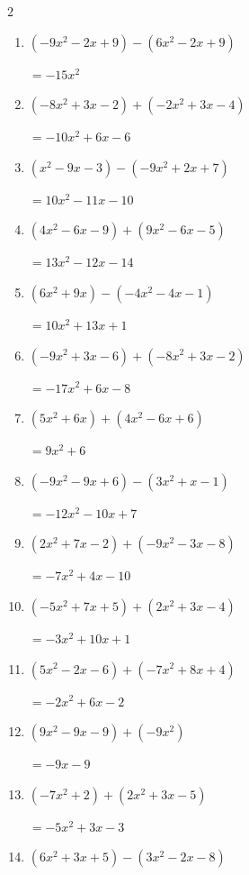 \begin{multicols}{2}
\begin{enumerate}
        $=-2x^{2}+8x+11$

  \item $(-9x^{2}-2x+9)-(6x^{2}-2x+9)$

        $=-15x^{2}$

  \item $(-8x^{2}+3x-2)+(-2x^{2}+3x-4)$

        $=-10x^{2}+6x-6$

  \item $(x^{2}-9x-3)-(-9x^{2}+2x+7)$

        $=10x^{2}-11x-10$

  \item $(4x^{2}-6x-9)+(9x^{2}-6x-5)$

        $=13x^{2}-12x-14$

  \item $(6x^{2}+9x)-(-4x^{2}-4x-1)$

        $=10x^{2}+13x+1$

\columnbreak %

  \item $(-9x^{2}+3x-6)+(-8x^{2}+3x-2)$

        $=-17x^{2}+6x-8$

  \item $(5x^{2}+6x)+(4x^{2}-6x+6)$

        $=9x^{2}+6$

  \item $(-9x^{2}-9x+6)-(3x^{2}+x-1)$

        $=-12x^{2}-10x+7$

  \item $(2x^{2}+7x-2)+(-9x^{2}-3x-8)$

        $=-7x^{2}+4x-10$

  \item $(-5x^{2}+7x+5)+(2x^{2}+3x-4)$

        $=-3x^{2}+10x+1$

  \item $(5x^{2}-2x-6)+(-7x^{2}+8x+4)$

        $=-2x^{2}+6x-2$

  \item $(9x^{2}-9x-9)+(-9x^{2})$

        $=-9x-9$

  \item $(-7x^{2}+2)+(2x^{2}+3x-5)$

        $=-5x^{2}+3x-3$

  \item $(6x^{2}+3x+5)-(3x^{2}-2x-8)$


\end{enumerate}
\end{multicols}
